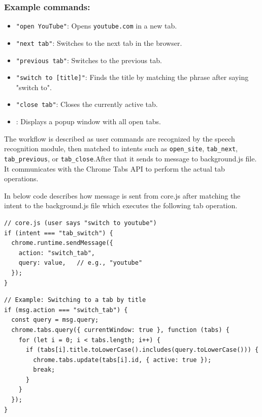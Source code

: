 \subsubsection*{Example commands:}
\begin{itemize}
    \item \texttt{"open YouTube"}: Opens \texttt{youtube.com} in a new tab.
    \item \texttt{"next tab"}: Switches to the next tab in the browser.
    \item \texttt{"previous tab"}: Switches to the previous tab.
    \item \texttt{"switch to [title]"}: Finds the title by matching the phrase after saying "switch to". 
    \item \texttt{"close tab"}: Closes the currently active tab.
    \item  {}: Displays a popup window with all open tabs.
\end{itemize}

The workflow is described as user commands are recognized by the speech recognition module, then matched to intents such as \texttt{open\_site}, \texttt{tab\_next}, \texttt{tab\_previous}, or \texttt{tab\_close}.After that it sends to message to background.js file. It communicates with the Chrome Tabs API to perform the actual tab operations.

In below code describes how message is sent from core.js after matching the intent to the background.js file which executes the following tab operation.

\begin{verbatim}
// core.js (user says "switch to youtube")
if (intent === "tab_switch") {
  chrome.runtime.sendMessage({
    action: "switch_tab",
    query: value,   // e.g., "youtube"
  });
}
\end{verbatim}

\begin{verbatim}
// Example: Switching to a tab by title
if (msg.action === "switch_tab") {
  const query = msg.query;
  chrome.tabs.query({ currentWindow: true }, function (tabs) {
    for (let i = 0; i < tabs.length; i++) {
      if (tabs[i].title.toLowerCase().includes(query.toLowerCase())) {
        chrome.tabs.update(tabs[i].id, { active: true });
        break;
      }
    }
  });
}
\end{verbatim}

